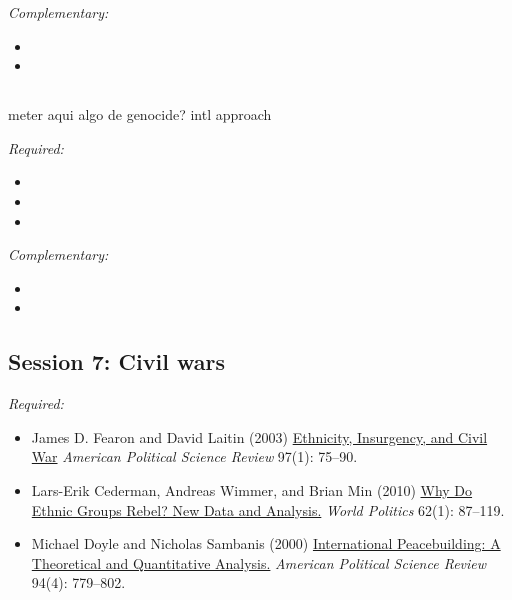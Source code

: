 \documentclass[12pt, a4paper]{article}
\begin{document}



\noindent\textit{Complementary:}

\begin{itemize}
  \item
  \item
\end{itemize}

\vspace{20pt}
\hline
\subsection*{{\color{red}{Session 6: International borders and state size}}}

meter aqui algo de genocide? intl approach

\noindent\textit{Required:}

\begin{itemize}
  \item
  \item
  \item
\end{itemize}

\noindent\textit{Complementary:}

\begin{itemize}
  \item
  \item
\end{itemize}

\vspace{20pt}
\hline
\subsection*{Session 7: Civil wars}

\noindent\textit{Required:}

\begin{itemize}
  \item James D. Fearon and David Laitin (2003) \href{https://doi.org/10.1017/S0003055403000534}{Ethnicity, Insurgency, and Civil War} \textit{American Political Science Review} 97(1): 75--90.
  \item Lars-Erik Cederman, Andreas Wimmer, and Brian Min (2010) \href{https://doi.org/10.1017/S0043887109990219}{Why Do Ethnic Groups Rebel? New Data and Analysis.} \textit{World Politics} 62(1): 87--119.
  \item Michael Doyle and Nicholas Sambanis (2000) \href{https://doi.org/10.2307/2586208}{International Peacebuilding: A Theoretical and Quantitative Analysis.} \textit{American Political Science Review} 94(4): 779--802.
\end{itemize}
\end{document}
